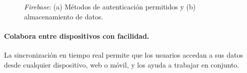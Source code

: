 \begin{figure}[tbp]
\begin{center}
\hspace{10ex}
\caption{\textit{Firebase}: (a) Métodos de autenticación permitidos y (b) almacenamiento de datos.}
\end{center}
\end{figure}

\paragraph{Colabora entre dispositivos con facilidad.} La sincronización en tiempo real permite que los usuarios accedan a sus datos desde cualquier dispositivo, web o móvil, y los ayuda a trabajar en conjunto.

